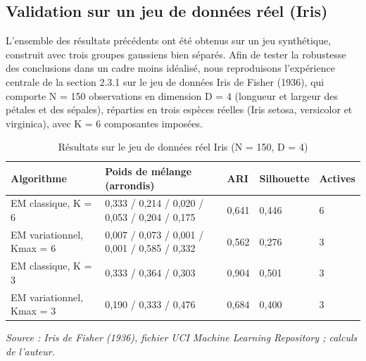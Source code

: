 \subsection{Validation sur un jeu de données réel (Iris)}
L'ensemble des résultats précédents ont été obtenus sur un jeu synthétique, construit avec trois groupes gaussiens bien séparés. Afin de tester la robustesse des conclusions dans un cadre moins idéalisé, nous reproduisons l'expérience centrale de la section 2.3.1 sur le jeu de données Iris de Fisher (1936), qui comporte N = 150 observations en dimension D = 4 (longueur et largeur des pétales et des sépales), réparties en trois espèces réelles (Iris setosa, versicolor et virginica), avec K = 6 composantes imposées.

\begin{table}[H]
\centering
\small
\setlength{\tabcolsep}{0.14cm}
\footnotesize
\begin{tabular}{|p{3.0cm}|p{4.7cm}|p{1.3cm}|p{1.8cm}|p{1.7cm}|}
\hline
\textbf{Algorithme} & \textbf{Poids de mélange (arrondis)} & \textbf{ARI} & \textbf{Silhouette} & \textbf{Actives} \\
\hline
EM classique, K = 6 & 0,333 / 0,214 / 0,020 / 0,053 / 0,204 / 0,175 & 0,641 & 0,446 & 6 \\
\hline
EM variationnel, Kmax = 6 & 0,007 / 0,073 / 0,001 / 0,001 / 0,585 / 0,332 & 0,562 & 0,276 & 3 \\
\hline
EM classique, K = 3 & 0,333 / 0,364 / 0,303 & 0,904 & 0,501 & 3 \\
\hline
EM variationnel, Kmax = 3 & 0,190 / 0,333 / 0,476 & 0,684 & 0,400 & 3 \\
\hline
\end{tabular}
\caption{Résultats sur le jeu de données réel Iris (N = 150, D = 4)}
\label{tab:2_13}
\end{table}
\emph{Source : Iris de Fisher (1936), fichier UCI Machine Learning Repository ; calculs de l'auteur.}

